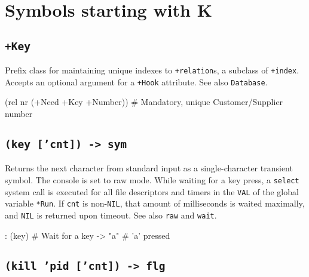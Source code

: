 %
%
%



\chapter{Symbols starting with K}


 
\section*{\texttt{+Key}}
\label{sec:func-ref-K-+Key}


Prefix class for maintaining unique indexes to \texttt{+relation}s, a
subclass of \texttt{+index}. Accepts an optional argument for a
\texttt{+Hook} attribute. See also \texttt{Database}.


\begin{wideverbatim}
(rel nr (+Need +Key +Number))  # Mandatory, unique Customer/Supplier number
\end{wideverbatim}

 
\section*{\texttt{(key ['cnt]) -> sym}}
\label{sec:func-ref-K-(key ['cnt]) -> sym}


Returns the next character from standard input as a single-character
transient symbol. The console is set to raw mode. While waiting for a
key press, a \texttt{select} system call is executed for all file descriptors
and timers in the \texttt{VAL} of the global variable \texttt{*Run}. If \texttt{cnt} is
non-\texttt{NIL}, that amount of milliseconds is waited maximally, and \texttt{NIL} is
returned upon timeout. See also \texttt{raw} and \texttt{wait}.


\begin{wideverbatim}
: (key)           # Wait for a key
-> "a"            # 'a' pressed
\end{wideverbatim}

 
\section*{\texttt{(kill 'pid ['cnt]) -> flg}}
\label{sec:func-ref-K-(kill 'pid ['cnt]) -> flg}


